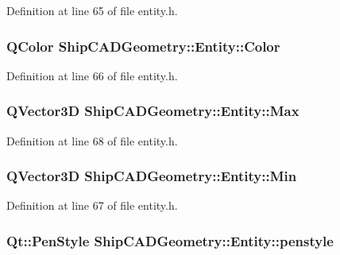 Definition at line 65 of file entity.\-h.

\hypertarget{classShipCADGeometry_1_1Entity_a55bb9634ac4c8f08909376006de897b4}{
\subsubsection[{Color}]{\setlength{\rightskip}{0pt plus 5cm}Q\-Color Ship\-C\-A\-D\-Geometry\-::\-Entity\-::\-Color}}\label{classShipCADGeometry_1_1Entity_a55bb9634ac4c8f08909376006de897b4}


Definition at line 66 of file entity.\-h.

\hypertarget{classShipCADGeometry_1_1Entity_a9b51589fe54df18ce1ca593de6e8bd1f}{
\subsubsection[{Max}]{\setlength{\rightskip}{0pt plus 5cm}Q\-Vector3\-D Ship\-C\-A\-D\-Geometry\-::\-Entity\-::\-Max\hspace{0.3cm}{\ttfamily [read]}}}\label{classShipCADGeometry_1_1Entity_a9b51589fe54df18ce1ca593de6e8bd1f}


Definition at line 68 of file entity.\-h.

\hypertarget{classShipCADGeometry_1_1Entity_a3bd95518fc98793471c03637679081a8}{
\subsubsection[{Min}]{\setlength{\rightskip}{0pt plus 5cm}Q\-Vector3\-D Ship\-C\-A\-D\-Geometry\-::\-Entity\-::\-Min\hspace{0.3cm}{\ttfamily [read]}}}\label{classShipCADGeometry_1_1Entity_a3bd95518fc98793471c03637679081a8}


Definition at line 67 of file entity.\-h.

\hypertarget{classShipCADGeometry_1_1Entity_adf613c5cb8169e0915f8d15aad664d4a}{
\subsubsection[{penstyle}]{\setlength{\rightskip}{0pt plus 5cm}Qt\-::\-Pen\-Style Ship\-C\-A\-D\-Geometry\-::\-Entity\-::penstyle}}\label{classShipCADGeometry_1_1Entity_adf613c5cb8169e0915f8d15aad664d4a}


